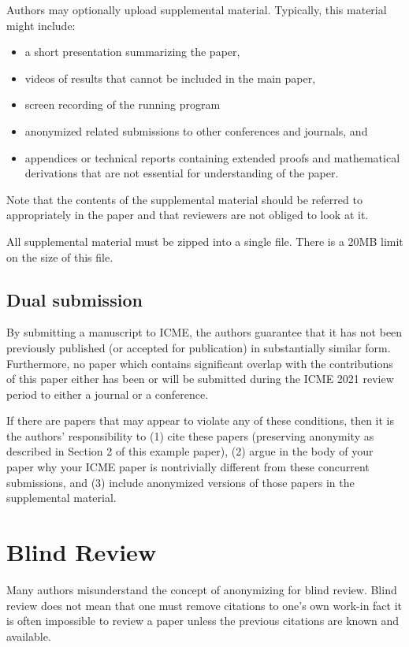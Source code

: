\documentclass{article}
\begin{document}
Authors may optionally upload supplemental material. Typically, this material might include:
\begin{itemize}
  \item a short presentation summarizing the paper,
  \item videos of results that cannot be included in the main paper,
  \item screen recording of the running program
  \item anonymized related submissions to other conferences and journals, and
  \item appendices or technical reports containing extended proofs and mathematical derivations that are not essential for understanding of the paper.
\end{itemize}

Note that the contents of the supplemental material should be referred to appropriately in the paper and that reviewers are not obliged to look at it.

All supplemental material must be zipped into a single file. There is a 20MB limit on the size of this file.

\subsection{Dual submission}

By submitting a manuscript to ICME, the authors guarantee that it has not been previously published (or accepted for publication) in substantially similar form. Furthermore, no paper which contains significant overlap with the contributions of this paper either has been or will be submitted during the ICME 2021 review period to either a journal or a conference.

If there are papers that may appear to violate any of these conditions, then it is the authors' responsibility to (1) cite these papers (preserving anonymity as described in Section 2 of this example paper), (2) argue in the body of your paper why your ICME paper is nontrivially different from these concurrent submissions, and (3) include anonymized versions of those papers in the supplemental material.

\section{Blind Review}

Many authors misunderstand the concept of anonymizing for blind review. Blind review does not mean that one must remove citations to one's own work-in fact it is often impossible to review a paper unless the previous citations are known and available.
\end{document}
